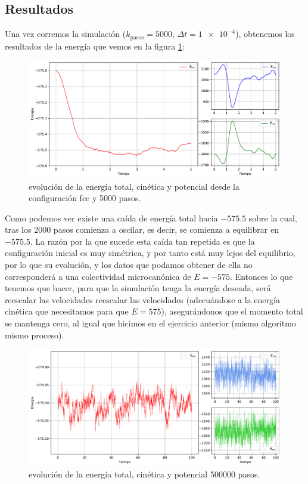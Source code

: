 \documentclass[11pt]{article} %
\begin{document}
\subsection{Resultados}

Una vez corremos la simulación ($k_{\text{pasos}}=5000$, $\Delta t=\num{1e-4}$), obtenemos los resultados de la energía que vemos en la figura \ref{Fig:01}:
\begin{figure}[h!] \centering
	\includegraphics[width=1.0\textwidth]{../../Graficas/Et-equilibra.pdf}
	\caption{evolución de la energía total, cinética y potencial desde la configuración fcc y 5000 pasos.}
	\label{Fig:01}
\end{figure}	


Como podemos ver existe una caída de energía total hacia $-575.5$ sobre la cual, tras los 2000 pasos comienza a oscilar, es decir, se comienza a equilibrar en $-575.5$. La razón por la que sucede esta caída tan repetida es que la configuración inicial es muy simétrica, y por tanto está muy lejos del equilibrio, por lo que su evolución, y los datos que podamos obtener de ella no corresponderá a una colectividad microcanónica de $E=-575$. Entonces lo que tenemos que hacer, para que la simulación tenga la energía deseada, será reescalar las velocidades reescalar las velocidades (adecuándose a la energía cinética que necesitamos para que $E=575$), asegurándonos que el momento total se mantenga cero, al igual que hicimos en el ejercicio anterior (mismo algoritmo mismo proceso).


\begin{figure}[h!] \centering
	\includegraphics[width=1.0\textwidth]{../../Graficas/Et-equilibra-500K.pdf}
	\caption{evolución de la energía total, cinética y potencial 500000 pasos.}
	\label{Fig:04}
\end{figure}	
\end{document}
